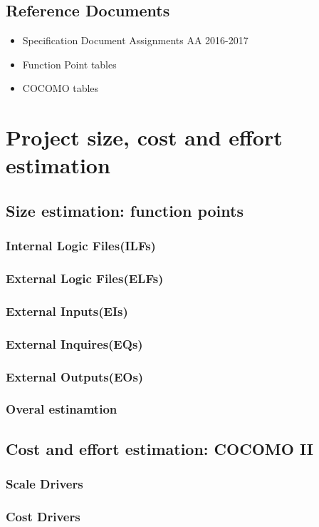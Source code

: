 \documentclass{article}
\begin{document}
\subsection{Reference Documents}
\begin{itemize}
	\item Specification Document Assignments AA 2016-2017
	\item Function Point tables
	\item COCOMO tables
\end{itemize}
\newpage

\section{Project size, cost and effort estimation}
\subsection{Size estimation: function points}
	\subsubsection{Internal Logic Files(ILFs)}
	\subsubsection{External Logic Files(ELFs)}
	\subsubsection{External Inputs(EIs)}
	\subsubsection{External Inquires(EQs)}
	\subsubsection{External Outputs(EOs)}
	\subsubsection{Overal estinamtion}
\subsection{Cost and effort estimation: COCOMO II}
	\subsubsection{Scale Drivers}
	\subsubsection{Cost Drivers}
\end{document}
